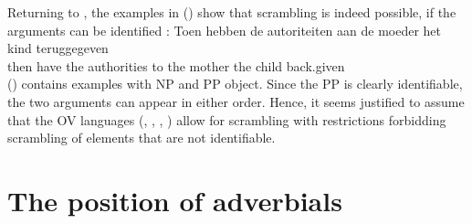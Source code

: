 Returning to , the examples in () show that scrambling is indeed possible, if the arguments can be
identified \parencites[]{GHdRvdT1984a-ed}[, 152]{Haider2010a}:
\eal
\ex
{}
\ex 
\gll Toen hebben de  autoriteiten aan de moeder  het kind  teruggegeven\\
     then have   the authorities  to  the mother the child back.given\\
\zl
() contains examples with NP and PP object. Since the PP is clearly identifiable, the two
arguments can appear in either order. Hence, it seems justified to assume that the OV languages (,
, , ) allow for scrambling with restrictions forbidding scrambling of elements that
are not identifiable.%

\section{The position of adverbials}
\label{sec-phenomena-position-of-adverbials}

